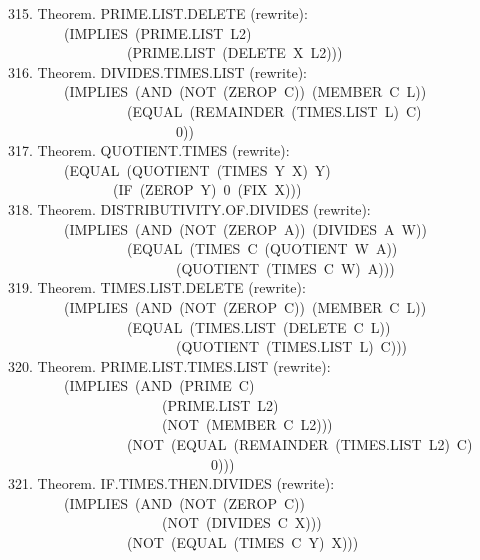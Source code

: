 \documentclass[10pt]{book}
\newenvironment{pubasis}{\begin{flushleft}}{\end{flushleft}}
\begin{document}
\begin{pubasis}
315.    Theorem.  PRIME.LIST.DELETE (rewrite):\\
~~~~~~~~(IMPLIES~(PRIME.LIST~L2)\\
~~~~~~~~~~~~~~~~~(PRIME.LIST~(DELETE~X~L2)))\\

316.    Theorem.  DIVIDES.TIMES.LIST (rewrite):\\
~~~~~~~~(IMPLIES~(AND~(NOT~(ZEROP~C))~(MEMBER~C~L))\\
~~~~~~~~~~~~~~~~~(EQUAL~(REMAINDER~(TIMES.LIST~L)~C)\\
~~~~~~~~~~~~~~~~~~~~~~~~0))\\

317.    Theorem.  QUOTIENT.TIMES (rewrite):\\
~~~~~~~~(EQUAL~(QUOTIENT~(TIMES~Y~X)~Y)\\
~~~~~~~~~~~~~~~(IF~(ZEROP~Y)~0~(FIX~X)))\\

318.    Theorem.  DISTRIBUTIVITY.OF.DIVIDES (rewrite):\\
~~~~~~~~(IMPLIES~(AND~(NOT~(ZEROP~A))~(DIVIDES~A~W))\\
~~~~~~~~~~~~~~~~~(EQUAL~(TIMES~C~(QUOTIENT~W~A))\\
~~~~~~~~~~~~~~~~~~~~~~~~(QUOTIENT~(TIMES~C~W)~A)))\\

319.    Theorem.  TIMES.LIST.DELETE (rewrite):\\
~~~~~~~~(IMPLIES~(AND~(NOT~(ZEROP~C))~(MEMBER~C~L))\\
~~~~~~~~~~~~~~~~~(EQUAL~(TIMES.LIST~(DELETE~C~L))\\
~~~~~~~~~~~~~~~~~~~~~~~~(QUOTIENT~(TIMES.LIST~L)~C)))\\

320.    Theorem.  PRIME.LIST.TIMES.LIST (rewrite):\\
~~~~~~~~(IMPLIES~(AND~(PRIME~C)\\
~~~~~~~~~~~~~~~~~~~~~~(PRIME.LIST~L2)\\
~~~~~~~~~~~~~~~~~~~~~~(NOT~(MEMBER~C~L2)))\\
~~~~~~~~~~~~~~~~~(NOT~(EQUAL~(REMAINDER~(TIMES.LIST~L2)~C)\\
~~~~~~~~~~~~~~~~~~~~~~~~~~~~~0)))\\

321.    Theorem.  IF.TIMES.THEN.DIVIDES (rewrite):\\
~~~~~~~~(IMPLIES~(AND~(NOT~(ZEROP~C))\\
~~~~~~~~~~~~~~~~~~~~~~(NOT~(DIVIDES~C~X)))\\
~~~~~~~~~~~~~~~~~(NOT~(EQUAL~(TIMES~C~Y)~X)))\\


\end{pubasis}
\end{document}
